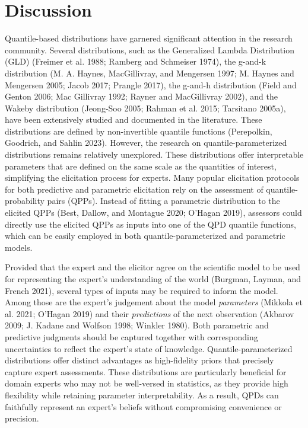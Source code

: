 \documentclass[
]{interact}
\begin{document}
\section{Discussion}\label{discussion}

Quantile-based distributions have garnered significant attention in the
research community. Several distributions, such as the Generalized
Lambda Distribution (GLD) (Freimer et al. 1988; Ramberg and Schmeiser
1974), the g-and-k distribution (M. A. Haynes, MacGillivray, and
Mengersen 1997; M. Haynes and Mengersen 2005; Jacob 2017; Prangle 2017),
the g-and-h distribution (Field and Genton 2006; Mac Gillivray 1992;
Rayner and MacGillivray 2002), and the Wakeby distribution (Jeong-Soo
2005; Rahman et al. 2015; Tarsitano 2005a), have been extensively
studied and documented in the literature. These distributions are
defined by non-invertible quantile functions (Perepolkin, Goodrich, and
Sahlin 2023). However, the research on quantile-parameterized
distributions remains relatively unexplored. These distributions offer
interpretable parameters that are defined on the same scale as the
quantities of interest, simplifying the elicitation process for experts.
Many popular elicitation protocols for both predictive and parametric
elicitation rely on the assessment of quantile-probability pairs (QPPs).
Instead of fitting a parametric distribution to the elicited QPPs (Best,
Dallow, and Montague 2020; O'Hagan 2019), assessors could directly use
the elicited QPPs as inputs into one of the QPD quantile functions,
which can be easily employed in both quantile-parameterized and
parametric models.

Provided that the expert and the elicitor agree on the scientific model
to be used for representing the expert's understanding of the world
(Burgman, Layman, and French 2021), several types of inputs may be
required to inform the model. Among those are the expert's judgement
about the model \emph{parameters} (Mikkola et al. 2021; O'Hagan 2019)
and their \emph{predictions} of the next observation (Akbarov 2009; J.
Kadane and Wolfson 1998; Winkler 1980). Both parametric and predictive
judgments should be captured together with corresponding uncertainties
to reflect the expert's state of knowledge. Quantile-parameterized
distributions offer distinct advantages as high-fidelity priors that
precisely capture expert assessments. These distributions are
particularly beneficial for domain experts who may not be well-versed in
statistics, as they provide high flexibility while retaining parameter
interpretability. As a result, QPDs can faithfully represent an expert's
beliefs without compromising convenience or precision.
\end{document}

